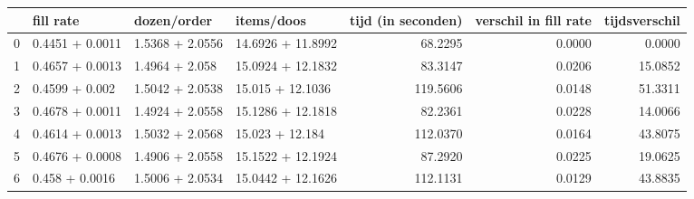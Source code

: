 \begin{tabular}{llllrrr}
\toprule
{} &        fill rate &      dozen/order &         items/doos &  tijd (in seconden) &  verschil in fill rate &  tijdsverschil \\
\midrule
0 &  0.4451 + 0.0011 &  1.5368 + 2.0556 &  14.6926 + 11.8992 &             68.2295 &                 0.0000 &         0.0000 \\
1 &  0.4657 + 0.0013 &   1.4964 + 2.058 &  15.0924 + 12.1832 &             83.3147 &                 0.0206 &        15.0852 \\
2 &   0.4599 + 0.002 &  1.5042 + 2.0538 &   15.015 + 12.1036 &            119.5606 &                 0.0148 &        51.3311 \\
3 &  0.4678 + 0.0011 &  1.4924 + 2.0558 &  15.1286 + 12.1818 &             82.2361 &                 0.0228 &        14.0066 \\
4 &  0.4614 + 0.0013 &  1.5032 + 2.0568 &    15.023 + 12.184 &            112.0370 &                 0.0164 &        43.8075 \\
5 &  0.4676 + 0.0008 &  1.4906 + 2.0558 &  15.1522 + 12.1924 &             87.2920 &                 0.0225 &        19.0625 \\
6 &   0.458 + 0.0016 &  1.5006 + 2.0534 &  15.0442 + 12.1626 &            112.1131 &                 0.0129 &        43.8835 \\
\bottomrule
\end{tabular}
